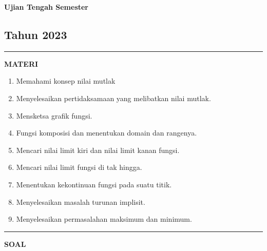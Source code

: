 \newpage
\begin{flushright}
    \textbf{\Large{Ujian Tengah Semester}}
    \subsection*{Tahun 2023}
\end{flushright}
\vspace{0.5cm}
\hrule height 2pt
\vspace{0.5cm}
\begin{center}
    \textbf{\large{MATERI}}
    \begin{enumerate}[leftmargin=*, label={\arabic*}.]
        \item Memahami konsep nilai mutlak
        \item Menyelesaikan pertidaksamaan yang melibatkan nilai mutlak.
        \item Mensketsa grafik fungsi.
        \item Fungsi komposisi dan menentukan domain dan rangenya.
        \item Mencari nilai limit kiri dan nilai limit kanan fungsi.
        \item Mencari nilai limit fungsi di tak hingga.
        \item Menentukan kekontinuan fungsi pada suatu titik.
        \item Menyelesaikan masalah turunan implisit.
        \item Menyelesaikan permasalahan maksimum dan minimum.
    \end{enumerate}
\end{center}
\vspace{0.2cm}
\hrule height 1pt
\vspace{0.5cm}
\begin{center}
    \textbf{\large{SOAL}}
\end{center}

